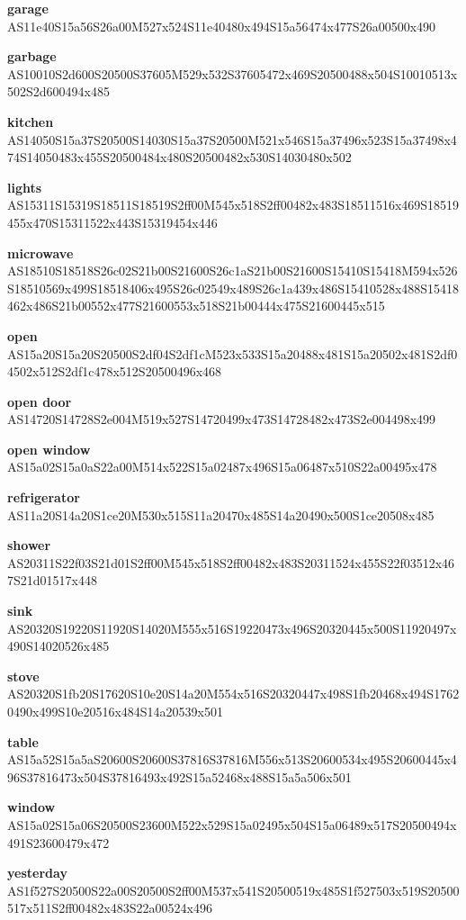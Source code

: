 \documentclass{article}
\begin{document}
\begin{glossary}
\textbf{garage}\\
AS11e40S15a56S26a00M527x524S11e40480x494S15a56474x477S26a00500x490

\textbf{garbage}\\
AS10010S2d600S20500S37605M529x532S37605472x469S20500488x504S10010513x502S2d600494x485

\textbf{kitchen}\\
AS14050S15a37S20500S14030S15a37S20500M521x546S15a37496x523S15a37498x474S14050483x455S20500484x480S20500482x530S14030480x502

\textbf{lights}\\
AS15311S15319S18511S18519S2ff00M545x518S2ff00482x483S18511516x469S18519455x470S15311522x443S15319454x446

\textbf{microwave}\\
AS18510S18518S26c02S21b00S21600S26c1aS21b00S21600S15410S15418M594x526S18510569x499S18518406x495S26c02549x489S26c1a439x486S15410528x488S15418462x486S21b00552x477S21600553x518S21b00444x475S21600445x515

\textbf{open}\\
AS15a20S15a20S20500S2df04S2df1cM523x533S15a20488x481S15a20502x481S2df04502x512S2df1c478x512S20500496x468

\textbf{open door}\\
AS14720S14728S2e004M519x527S14720499x473S14728482x473S2e004498x499

\textbf{open window}\\
AS15a02S15a0aS22a00M514x522S15a02487x496S15a06487x510S22a00495x478

\textbf{refrigerator}\\
AS11a20S14a20S1ce20M530x515S11a20470x485S14a20490x500S1ce20508x485

\textbf{shower}\\
AS20311S22f03S21d01S2ff00M545x518S2ff00482x483S20311524x455S22f03512x467S21d01517x448

\textbf{sink}\\
AS20320S19220S11920S14020M555x516S19220473x496S20320445x500S11920497x490S14020526x485

\textbf{stove}\\
AS20320S1fb20S17620S10e20S14a20M554x516S20320447x498S1fb20468x494S17620490x499S10e20516x484S14a20539x501

\textbf{table}\\
AS15a52S15a5aS20600S20600S37816S37816M556x513S20600534x495S20600445x496S37816473x504S37816493x492S15a52468x488S15a5a506x501

\textbf{window}\\
AS15a02S15a06S20500S23600M522x529S15a02495x504S15a06489x517S20500494x491S23600479x472

\textbf{yesterday}\\
AS1f527S20500S22a00S20500S2ff00M537x541S20500519x485S1f527503x519S20500517x511S2ff00482x483S22a00524x496

\end{glossary}
\end{document}
